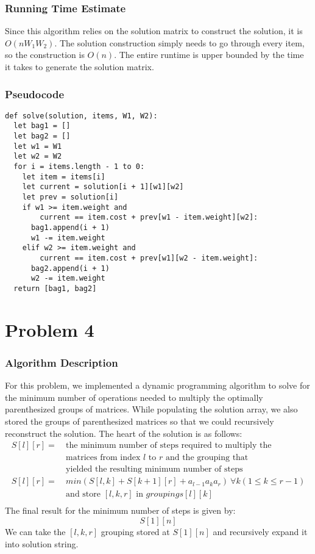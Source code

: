 \documentclass{math}
\begin{document}
\subsubsection*{Running Time Estimate}
Since this algorithm relies on the solution matrix to construct the solution,
it is \( O(nW_1W_2) \). The solution construction simply needs to go through
every item, so the construction is \( O(n) \). The entire runtime is upper
bounded by the time it takes to generate the solution matrix.

\subsubsection*{Pseudocode}
\begin{lstlisting}
def solve(solution, items, W1, W2):
  let bag1 = []
  let bag2 = []
  let w1 = W1
  let w2 = W2
  for i = items.length - 1 to 0:
    let item = items[i]
    let current = solution[i + 1][w1][w2]
    let prev = solution[i]
    if w1 >= item.weight and
        current == item.cost + prev[w1 - item.weight][w2]:
      bag1.append(i + 1)
      w1 -= item.weight
    elif w2 >= item.weight and
        current == item.cost + prev[w1][w2 - item.weight]:
      bag2.append(i + 1)
      w2 -= item.weight
  return [bag1, bag2]
\end{lstlisting}

\section*{Problem 4}

\subsubsection*{Algorithm Description}
For this problem, we implemented a dynamic programming algorithm to solve for
the minimum number of operations needed to multiply the optimally parenthesized
groups of matrices. While populating the solution array, we also stored the
groups of parenthesized matrices so that we could recursively reconstruct the
solution. The heart of the solution is as follows:
\begin{align*}
  S[l][r] =~ & \text{the minimum number of steps required to multiply the} \\
  & \text{matrices from index } l \text{ to } r \text{ and the grouping that} \\
  & \text{yielded the resulting minimum number of steps} \\
  S[l][r] =~ &
    min(S[l,k] + S[k+1][r] + a_{l-1}a_ka_r)~\forall{k} (1\le k\le r-1) \\
  & \text{and store } [l, k, r] \text{ in } groupings[l][k] \\
\end{align*}
The final result for the minimum number of steps is given by:
\[ S[1][n] \]
We can take the \( [l,k,r] \) grouping stored at \( S[1][n] \) and recursively
expand it into solution string.
\end{document}
